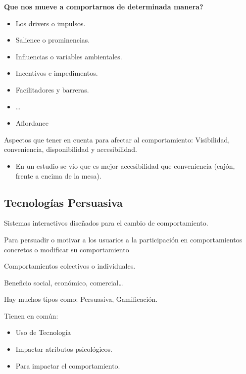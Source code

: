 \documentclass[12pt]{report} %
\begin{document}
\textbf{Que nos mueve a comportarnos de determinada manera?}
\begin{itemize}
  \item Los drivers o impulsos.
  \item Salience o prominencias.
  \item Influencias o variables ambientales.
  \item Incentivos e impedimentos.
  \item Facilitadores y barreras.
  \item \dots
  \item Affordance
\end{itemize}

Aspectos que tener en cuenta para afectar al comportamiento: Visibilidad, conveniencia, disponibilidad y accesibilidad.
\begin{itemize}
  \item En un estudio se vio que es mejor accesibilidad que conveniencia (cajón, frente a encima de la mesa).
\end{itemize}  


\subsection{Tecnologías Persuasiva}
Sistemas interactivos diseñados para el cambio de comportamiento.

Para persuadir o motivar a los usuarios a la participación en comportamientos concretos o modificar su comportamiento 

Comportamientos colectivos o individuales.

Beneficio social, económico, comercial\dots

Hay muchos tipos como: Persuasiva, Gamificación.

Tienen en común:
\begin{itemize}
  \item Uso de Tecnología
  \item Impactar atributos psicológicos.
  \item Para impactar el comportamiento.
\end{itemize}
\end{document}
